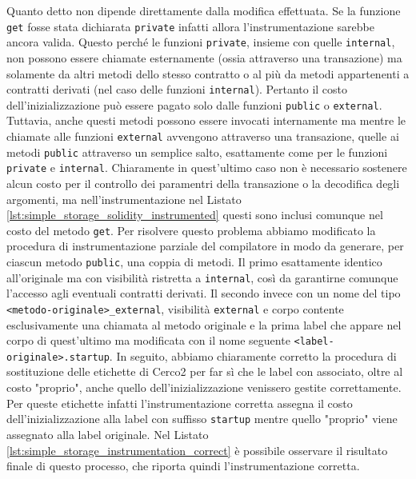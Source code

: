 \documentclass[12pt,a4paper,openright,oneside]{report}
\theoremstyle{definition}
\begin{document}
Quanto detto non dipende direttamente dalla modifica effettuata. Se la funzione \texttt{get} fosse stata dichiarata \texttt{private} infatti allora l'instrumentazione sarebbe ancora valida. Questo perch\'{e} le funzioni \texttt{private}, insieme con quelle \texttt{internal}, non possono essere chiamate esternamente (ossia attraverso una transazione) ma solamente da altri metodi dello stesso contratto o al pi\`{u} da metodi appartenenti a contratti derivati (nel caso delle funzioni \texttt{internal}). Pertanto il costo dell'inizializzazione pu\`{o} essere pagato solo dalle funzioni \texttt{public} o \texttt{external}. Tuttavia, anche questi metodi possono essere invocati internamente ma mentre le chiamate alle funzioni \texttt{external} avvengono attraverso una transazione, quelle ai metodi \texttt{public} attraverso un semplice salto, esattamente come per le funzioni \texttt{private} e \texttt{internal}. Chiaramente in quest'ultimo caso non \`{e} necessario sostenere alcun costo per il controllo dei paramentri della transazione o la decodifica degli argomenti, ma nell'instrumentazione nel Listato \ref{lst:simple_storage_solidity_instrumented} questi sono inclusi comunque nel costo del metodo \texttt{get}. Per risolvere questo problema abbiamo modificato la procedura di instrumentazione parziale del compilatore in modo da generare, per ciascun metodo \texttt{public}, una coppia di metodi. Il primo esattamente identico all'originale ma con visibilit\`{a} ristretta a \texttt{internal}, cos\`{i} da garantirne comunque l'accesso agli eventuali contratti derivati. Il secondo invece con un nome del tipo \texttt{<metodo-originale>\_external}, visibilit\`{a} \texttt{external} e corpo contente esclusivamente una chiamata al metodo originale e la prima label che appare nel corpo di quest'ultimo ma modificata con il nome seguente \texttt{<label-originale>.startup}. In seguito, abbiamo chiaramente corretto la procedura di sostituzione delle etichette di Cerco2 per far s\`{i} che le label con associato, oltre al costo "proprio", anche quello dell'inizializzazione venissero gestite correttamente. Per queste etichette infatti l'instrumentazione corretta assegna il costo dell'inizializzazione alla label con suffisso \texttt{startup} mentre quello "proprio" viene assegnato alla label originale. Nel Listato \ref{lst:simple_storage_instrumentation_correct} \`{e} possibile osservare il risultato finale di questo processo, che riporta quindi l'instrumentazione corretta.
\end{document}
